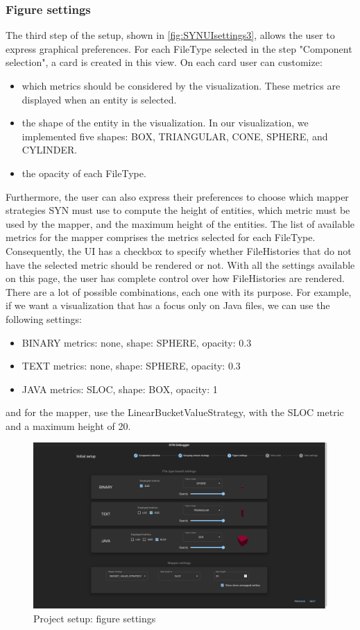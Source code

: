 \subsubsection*{Figure settings}
The third step of the setup, shown in \autoref{fig:SYNUIsettings3}, allows the user to express graphical preferences. 
For each FileType selected in the step "Component selection", a card is created in this view. 
On each card user can customize:
\begin{itemize}
    \item which metrics should be considered by the visualization. These metrics are displayed when an entity is selected.
    \item the shape of the entity in the visualization. In our visualization, we implemented five shapes: BOX, TRIANGULAR, CONE, SPHERE, and CYLINDER. 
    \item the opacity of each FileType. 
\end{itemize}

Furthermore, the user can also express their preferences to choose which mapper strategies SYN must use to compute the height of entities, which metric must be used by the mapper, and the maximum height of the entities. 
The list of available metrics for the mapper comprises the metrics selected for each FileType.
Consequently, the UI has a checkbox to specify whether FileHistories that do not have the selected metric should be rendered or not. 
\bigbreak
With all the settings available on this page, the user has complete control over how FileHistories are rendered. 
There are a lot of possible combinations, each one with its purpose. For example, if we want a visualization that has a focus only on Java files, we can use the following settings:
\begin{itemize}
    \item BINARY metrics: none, shape: SPHERE, opacity: 0.3
    \item TEXT metrics: none, shape: SPHERE, opacity: 0.3
    \item JAVA metrics: SLOC, shape: BOX, opacity: 1
\end{itemize}
and for the mapper, use the LinearBucketValueStrategy, with the SLOC metric and a maximum height of 20. 

\begin{figure}
    \center
    \includegraphics[width=\textwidth]{SYNUI-settings3.png}
    \caption{Project setup: figure settings}
    \label{fig:SYNUIsettings3}
\end{figure}

